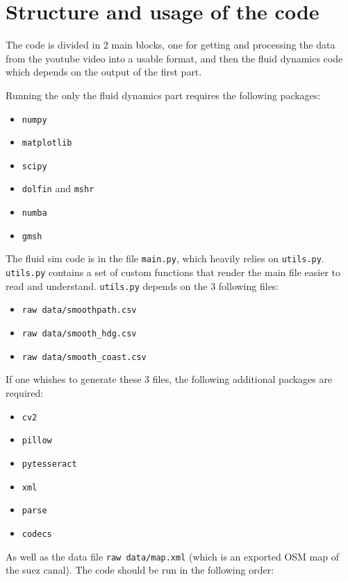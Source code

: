 \documentclass[a4paper]{article}
\begin{document}
\newpage
\appendix
\section{Structure and usage of the code}
The code is divided in 2 main blocks, one for getting and processing the data from the youtube video\cite{goodvideo} into a usable format, and then the fluid dynamics code which depends on the output of the first part. 

Running the only the fluid dynamics part requires the following packages:
\begin{itemize}
    \item \texttt{numpy}
    \item \texttt{matplotlib}
    \item \texttt{scipy}
    \item \texttt{dolfin} and \texttt{mshr}
    \item \texttt{numba}
    \item \texttt{gmsh}
\end{itemize}
The fluid sim code is in the file \texttt{main.py}, which heavily relies on \texttt{utils.py}. \texttt{utils.py} contains a set of custom functions that render the main file easier to read and understand. \texttt{utils.py} depends on the 3 following files:
\begin{itemize}
    \item \texttt{raw data/smoothpath.csv}
    \item \texttt{raw data/smooth\_hdg.csv}
    \item \texttt{raw data/smooth\_coast.csv}
\end{itemize} 
If one whishes to generate these 3 files, the following additional packages are required:
\begin{itemize}
    \item \texttt{cv2}
    \item \texttt{pillow}
    \item \texttt{pytesseract}
    \item \texttt{xml}
    \item \texttt{parse}
    \item \texttt{codecs}
\end{itemize}
As well as the data file \texttt{raw data/map.xml} (which is an exported OSM map of the suez canal). The code should be run in the following order:
\end{document}
